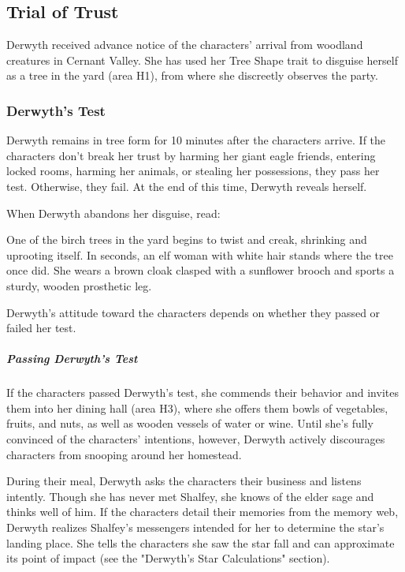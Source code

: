 \documentclass[10pt,a4paper,twoside,bg=print,twocolumn,openany,nodeprecatedcode]{dndbook}
\begin{document}
\subsection{Trial of Trust}
Derwyth received advance notice of the characters' arrival from woodland creatures in Cernant Valley. She has used her Tree Shape trait to disguise herself as a tree in the yard (area H1), from where she discreetly observes the party.

\subsubsection{Derwyth's Test}
Derwyth remains in tree form for 10 minutes after the characters arrive. If the characters don't break her trust by harming her giant eagle friends, entering locked rooms, harming her animals, or stealing her possessions, they pass her test. Otherwise, they fail. At the end of this time, Derwyth reveals herself.

When Derwyth abandons her disguise, read:

\begin{DndReadAloud}{}
One of the birch trees in the yard begins to twist and creak, shrinking and uprooting itself. In seconds, an elf woman with white hair stands where the tree once did. She wears a brown cloak clasped with a sunflower brooch and sports a sturdy, wooden prosthetic leg.

\end{DndReadAloud}

Derwyth's attitude toward the characters depends on whether they passed or failed her test.

\subparagraph{Passing Derwyth's Test}
If the characters passed Derwyth's test, she commends their behavior and invites them into her dining hall (area H3), where she offers them bowls of vegetables, fruits, and nuts, as well as wooden vessels of water or wine. Until she's fully convinced of the characters' intentions, however, Derwyth actively discourages characters from snooping around her homestead.

During their meal, Derwyth asks the characters their business and listens intently. Though she has never met Shalfey, she knows of the elder sage and thinks well of him. If the characters detail their memories from the memory web, Derwyth realizes Shalfey's messengers intended for her to determine the star's landing place. She tells the characters she saw the star fall and can approximate its point of impact (see the "Derwyth's Star Calculations" section).
\end{document}
